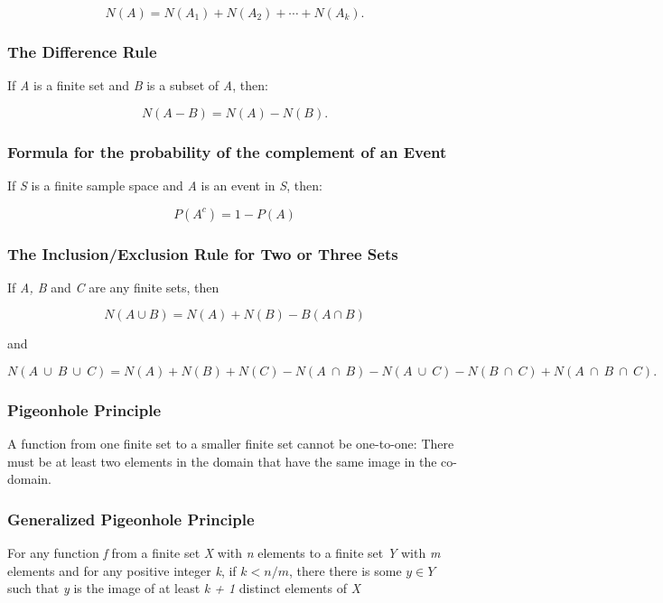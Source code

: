 \documentclass{article}
\begin{document}
\begin{equation*}
N(A) = N(A_1) + N(A_2) + \cdots + N(A_k).
\end{equation*}

\subsubsection*{The Difference Rule}
If \textit{A} is a finite set and \textit{B} is a subset of \textit{A}, then:

\begin{equation*}
N(A - B) = N(A) - N(B).
\end{equation*}

\subsubsection*{Formula for the probability of the complement of an Event}
If \textit{S} is a finite sample space and \textit{A} is an event in \textit{S}, then:

\begin{equation*}
P(A^c) = 1 - P(A)
\end{equation*}

\subsubsection*{The Inclusion/Exclusion Rule for Two or Three Sets}
If \textit{A, B} and \textit{C} are any finite sets, then

\begin{equation*}
N(A \cup B) = N(A) + N(B) - B(A \cap B)
\end{equation*}

and

\begin{equation*}
N(A \ \cup \ B \ \cup \ C) = N(A) + N(B) + N(C) - N(A \ \cap \ B) - N(A \ \cup \ C) - N(B \ \cap \ C) + N(A \ \cap \ B \ \cap \ C).
\end{equation*}

\subsubsection*{Pigeonhole Principle}
A function from one finite set to a smaller finite set cannot be one-to-one: There must be at least two elements in the domain that have the same image in the co-domain.

\subsubsection*{Generalized Pigeonhole Principle}
For any function \textit{f} from a finite set \textit{X} with \textit{n} elements to a finite set \textit{Y} with \textit{m} elements and for any positive integer \textit{k}, if $ k < n/m $, there there is some $y \in Y$ such that \textit{y} is the image of at least \textit{k + 1} distinct elements of \textit{X}
\end{document}
